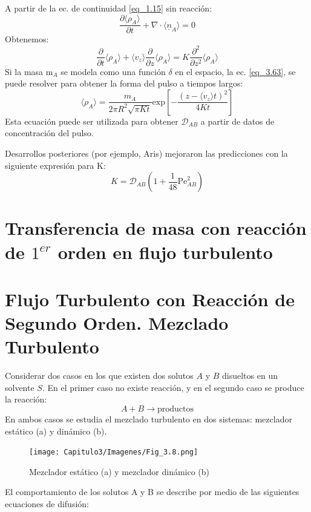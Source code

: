 A partir de la ec. de continuidad \eqref{eq_1.15}  sin reacción:
\[
\frac{\partial \langle \rho_A\rangle}{\partial t}+\nabla\cdot\langle \underline{n}_A\rangle=0
\]
\noindent Obtenemos: 
\begin{equation}
\frac{\partial}{\partial t} \langle \rho_A \rangle+ \langle v_z \rangle \frac{\partial}{\partial z} \langle \rho_A \rangle= K \frac{\partial^2}{\partial z^2} \langle \rho_A \rangle
    \label{eq_3.63}
\end{equation}
Si la masa m$_A$ se modela como una función $\delta$ en el espacio, la ec. \eqref{eq_3.63}, se puede resolver para obtener la forma del pulso a tiempos largos:
\begin{equation}
    \langle\rho_A\rangle=\frac{m_A}{2\pi R^2\sqrt{\pi Kt}}\text{exp}\left[-\frac{(z-\langle v_z\rangle t)^2}{4Kt}\right]
    \label{eq_3.64}
\end{equation}
Esta ecuación puede ser utilizada para obtener $\mathscr{D}_{AB}$ a partir de datos de concentración del pulso.

Desarrollos posteriores (por ejemplo, Aris) mejoraron las predicciones con la siguiente expresión para K:
\begin{equation}
    K=\mathscr{D}_{AB}\left( 1+\frac{1}{48} \text{Pe}^2_{AB}\right)
\end{equation}
\section{Transferencia de masa con reacción de $1^{er}$ orden en flujo turbulento}


\section{Flujo Turbulento con Reacción de Segundo Orden. Mezclado Turbulento}

Considerar dos casos en los que existen dos solutos $A$ y $B$ disueltos en un solvente $S$. En el primer caso no existe reacción, y en el segundo caso se produce la reacción:
\begin{equation*}
    A + B \rightarrow \text{productos}
\end{equation*}
En ambos casos se estudia el mezclado turbulento en dos sistemas: mezclador estático (a) y dinámico (b).

\begin{figure}[h]

        \texttt{[image: Capitulo3/Imagenes/Fig\_3.8.png]}
        \caption{Mezclador estático (a) y mezclador dinámico (b)}
        \label{fig:Fig_3.8}

\end{figure}
        El comportamiento de los solutos A y B se describe por medio de las siguientes ecuaciones de difusión:




